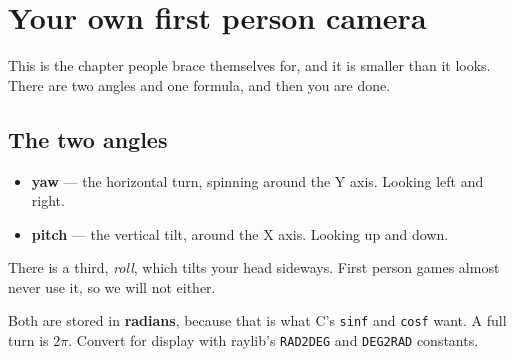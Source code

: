 \chapter{Your own first person camera}

This is the chapter people brace themselves for, and it is smaller than it looks.
There are two angles and one formula, and then you are done.

\section{The two angles}

\begin{center}
\end{center}

\begin{itemize}[leftmargin=*,itemsep=2pt]
  \item \textbf{yaw} --- the horizontal turn, spinning around the Y axis. Looking
        left and right.
  \item \textbf{pitch} --- the vertical tilt, around the X axis. Looking up and
        down.
\end{itemize}

There is a third, \emph{roll}, which tilts your head sideways. First person games
almost never use it, so we will not either.

Both are stored in \textbf{radians}, because that is what C's \lstinline|sinf|
and \lstinline|cosf| want. A full turn is $2\pi$. Convert for display with
raylib's \lstinline|RAD2DEG| and \lstinline|DEG2RAD| constants.

